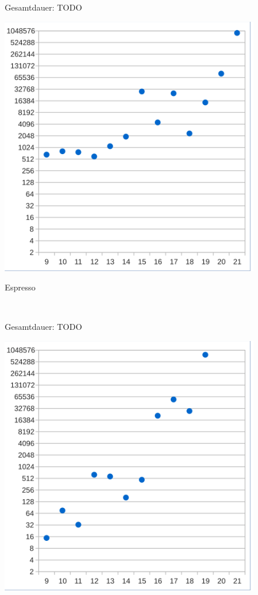 \begin{figure}[!h]
  \centering
  \begin{minipage}[t]{0.45\textwidth}
  \begin{flushleft}Gesamtdauer: TODO\end{flushleft}
  \includegraphics[scale=0.55]{images/eval_maurer-espresso}
  \begin{flushleft}Espresso\end{flushleft}
  \end{minipage}
  \begin{minipage}[t]{0.09\textwidth}
  ~~
  \end{minipage}
  \begin{minipage}[t]{0.45\textwidth}
  \begin{flushleft}Gesamtdauer: TODO\end{flushleft}
  \includegraphics[scale=0.55]{images/eval_maurer-tseitin}

\end{minipage}
\end{figure}
